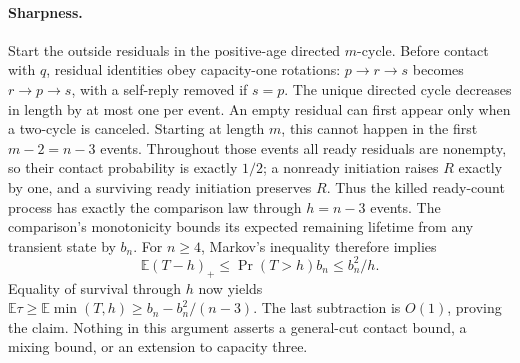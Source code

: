 \documentclass[11pt]{article}
\begin{document}
\paragraph{Sharpness.}
Start the outside residuals in the positive-age directed $m$-cycle.
Before contact with $q$, residual identities obey capacity-one rotations:
$p\to r\to s$ becomes $r\to p\to s$, with a self-reply removed if $s=p$.
The unique directed cycle decreases in length by at most one per event.
An empty residual can first appear only when a two-cycle is canceled.
Starting at length $m$, this cannot happen in the first $m-2=n-3$ events.
Throughout those events all ready residuals are nonempty, so their contact
probability is exactly $1/2$; a nonready initiation raises $R$ exactly by
one, and a surviving ready initiation preserves $R$. Thus the killed
ready-count process has exactly the comparison law through $h=n-3$ events.
The comparison's monotonicity bounds its expected remaining lifetime from
any transient state by $b_n$. For $n\ge4$, Markov's inequality therefore
implies
\[
 \mathbb E(T-h)_+\le\Pr(T>h)b_n\le b_n^2/h.
\]
Equality of survival through $h$ now yields
$\mathbb E\tau\ge\mathbb E\min(T,h)\ge b_n-b_n^2/(n-3)$.
The last subtraction is $O(1)$, proving the claim. Nothing in this argument
asserts a general-cut contact bound, a mixing bound, or an extension to
capacity three.
\end{document}

